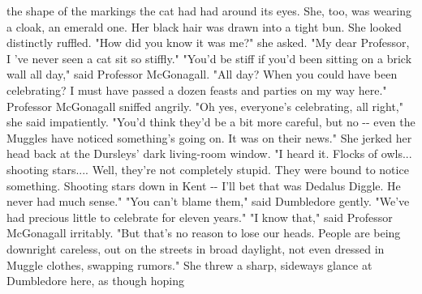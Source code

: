 \documentclass{article}%
\begin{document}
\newline%
the shape of the markings the cat had had around its eyes. She, too, was
\newline%
wearing a cloak, an emerald one. Her black hair was drawn into a tight
\newline%
bun. She looked distinctly ruffled.
\newline%
"How did you know it was me?" she asked.
\newline%
"My dear Professor, I 've never seen a cat sit so stiffly."
\newline%
"You'd be stiff if you'd been sitting on a brick wall all day," said
\newline%
Professor McGonagall.
\newline%
"All day? When you could have been celebrating? I must have passed a
\newline%
dozen feasts and parties on my way here."
\newline%
Professor McGonagall sniffed angrily.
\newline%
"Oh yes, everyone's celebrating, all right," she said impatiently.
\newline%
"You'd think they'd be a bit more careful, but no {-}{-} even the Muggles
\newline%
have noticed something's going on. It was on their news." She jerked her
\newline%
head back at the Dursleys' dark living{-}room window. "I heard it. Flocks
\newline%
of owls... shooting stars.... Well, they're not completely stupid. They
\newline%
were bound to notice something. Shooting stars down in Kent {-}{-} I'll bet
\newline%
that was Dedalus Diggle. He never had much sense."
\newline%
"You can't blame them," said Dumbledore gently. "We've had precious
\newline%
little to celebrate for eleven years."
\newline%
"I know that," said Professor McGonagall irritably. "But that's no
\newline%
reason to lose our heads. People are being downright careless, out on
\newline%
the streets in broad daylight, not even dressed in Muggle clothes,
\newline%
swapping rumors."
\newline%
She threw a sharp, sideways glance at Dumbledore here, as though hoping
\end{document}
